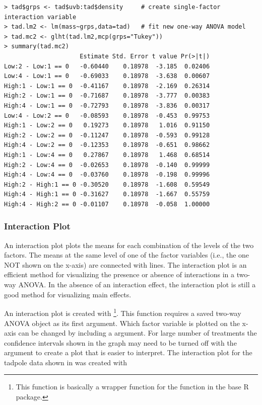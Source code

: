 \documentclass[10pt,openany]{book}\usepackage[]{graphicx}\usepackage[]{color}
\makeatletter
\newenvironment{kframe}{%
 \def\at@end@of@kframe{}%
 \ifinner\ifhmode%
  \def\at@end@of@kframe{\end{minipage}}%
  \begin{minipage}{\columnwidth}%
 \fi\fi%
 \def\FrameCommand##1{\hskip\@totalleftmargin \hskip-\fboxsep
 \colorbox{shadecolor}{##1}\hskip-\fboxsep
     \hskip-\linewidth \hskip-\@totalleftmargin \hskip\columnwidth}%
 \MakeFramed {\advance\hsize-\width
   \@totalleftmargin\z@ \linewidth\hsize
   \@setminipage}}%
 {\par\unskip\endMakeFramed%
 \at@end@of@kframe}
\newenvironment{knitrout}{}{} %
\makeatother
\begin{document}
\begin{knitrout}
\color{fgcolor}\begin{kframe}
\begin{verbatim}
> tad$grps <- tad$uvb:tad$density     # create single-factor interaction variable
> tad.lm2 <- lm(mass~grps,data=tad)   # fit new one-way ANOVA model
> tad.mc2 <- glht(tad.lm2,mcp(grps="Tukey"))
> summary(tad.mc2)
                     Estimate Std. Error t value Pr(>|t|)
Low:2 - Low:1 == 0   -0.60440    0.18978  -3.185  0.02406
Low:4 - Low:1 == 0   -0.69033    0.18978  -3.638  0.00607
High:1 - Low:1 == 0  -0.41167    0.18978  -2.169  0.26314
High:2 - Low:1 == 0  -0.71687    0.18978  -3.777  0.00383
High:4 - Low:1 == 0  -0.72793    0.18978  -3.836  0.00317
Low:4 - Low:2 == 0   -0.08593    0.18978  -0.453  0.99753
High:1 - Low:2 == 0   0.19273    0.18978   1.016  0.91150
High:2 - Low:2 == 0  -0.11247    0.18978  -0.593  0.99128
High:4 - Low:2 == 0  -0.12353    0.18978  -0.651  0.98662
High:1 - Low:4 == 0   0.27867    0.18978   1.468  0.68514
High:2 - Low:4 == 0  -0.02653    0.18978  -0.140  0.99999
High:4 - Low:4 == 0  -0.03760    0.18978  -0.198  0.99996
High:2 - High:1 == 0 -0.30520    0.18978  -1.608  0.59549
High:4 - High:1 == 0 -0.31627    0.18978  -1.667  0.55759
High:4 - High:2 == 0 -0.01107    0.18978  -0.058  1.00000
\end{verbatim}
\end{kframe}
\end{knitrout}

\subsubsection*{Interaction Plot}
An interaction plot plots the means for each combination of the levels of the two factors.  The means at the same level of one of the factor variables (i.e., the one NOT shown on the x-axis) are connected with lines.  The interaction plot is an efficient method for visualizing the presence or absence of interactions in a two-way ANOVA.  In the absence of an interaction effect, the interaction plot is still a good method for visualizing main effects.

An interaction plot is created with \footnote{This function is basically a wrapper function for the  function in the base R  package.}.  This function requires a saved two-way ANOVA  object as its first argument.  Which factor variable is plotted on the x-axis can be changed by including a  argument.  For large number of treatments the confidence intervals shown in the graph may need to be turned off with the  argument to create a plot that is easier to interpret.  The interaction plot for the tadpole data shown in  was created with
\end{document}
